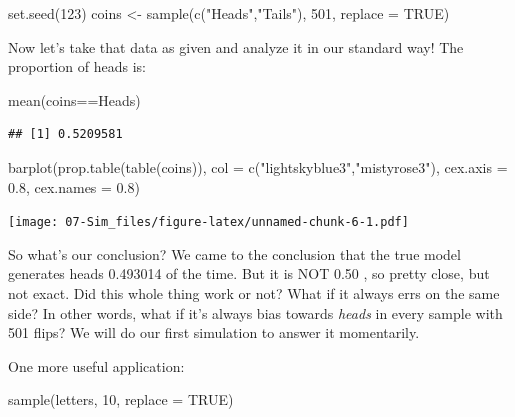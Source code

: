 \documentclass[
]{book}
\newenvironment{Shaded}{\begin{snugshade}}{\end{snugshade}}
\newcommand{\AttributeTok}[1]{\textcolor[rgb]{0.77,0.63,0.00}{#1}}
\newcommand{\ConstantTok}[1]{\textcolor[rgb]{0.00,0.00,0.00}{#1}}
\newcommand{\DecValTok}[1]{\textcolor[rgb]{0.00,0.00,0.81}{#1}}
\newcommand{\FloatTok}[1]{\textcolor[rgb]{0.00,0.00,0.81}{#1}}
\newcommand{\FunctionTok}[1]{\textcolor[rgb]{0.00,0.00,0.00}{#1}}
\newcommand{\NormalTok}[1]{#1}
\newcommand{\OtherTok}[1]{\textcolor[rgb]{0.56,0.35,0.01}{#1}}
\newcommand{\SpecialCharTok}[1]{\textcolor[rgb]{0.00,0.00,0.00}{#1}}
\newcommand{\StringTok}[1]{\textcolor[rgb]{0.31,0.60,0.02}{#1}}
\theoremstyle{definition}
\theoremstyle{definition}
\theoremstyle{definition}
\theoremstyle{definition}
\theoremstyle{remark}
\begin{document}
\begin{Shaded}
\begin{Highlighting}[]
\FunctionTok{set.seed}\NormalTok{(}\DecValTok{123}\NormalTok{)}
\NormalTok{coins }\OtherTok{\textless{}{-}} \FunctionTok{sample}\NormalTok{(}\FunctionTok{c}\NormalTok{(}\StringTok{"Heads"}\NormalTok{,}\StringTok{"Tails"}\NormalTok{), }\DecValTok{501}\NormalTok{, }\AttributeTok{replace =} \ConstantTok{TRUE}\NormalTok{)}
\end{Highlighting}
\end{Shaded}

Now let's take that data as given and analyze it in our standard way! The proportion of heads is:

\begin{Shaded}
\begin{Highlighting}[]
\FunctionTok{mean}\NormalTok{(coins}\SpecialCharTok{==}\StringTok{\textquotesingle{}Heads\textquotesingle{}}\NormalTok{)}
\end{Highlighting}
\end{Shaded}

\begin{verbatim}
## [1] 0.5209581
\end{verbatim}

\begin{Shaded}
\begin{Highlighting}[]
\FunctionTok{barplot}\NormalTok{(}\FunctionTok{prop.table}\NormalTok{(}\FunctionTok{table}\NormalTok{(coins)), }
        \AttributeTok{col =} \FunctionTok{c}\NormalTok{(}\StringTok{"lightskyblue3"}\NormalTok{,}\StringTok{"mistyrose3"}\NormalTok{),}
        \AttributeTok{cex.axis =} \FloatTok{0.8}\NormalTok{, }\AttributeTok{cex.names =} \FloatTok{0.8}\NormalTok{)}
\end{Highlighting}
\end{Shaded}

\texttt{[image: 07-Sim\_files/figure-latex/unnamed-chunk-6-1.pdf]}

So what's our conclusion? We came to the conclusion that the true model generates heads 0.493014 of the time. But it is NOT 0.50 , so pretty close, but not exact. Did this whole thing work or not? What if it always errs on the same side? In other words, what if it's always bias towards \emph{heads} in every sample with 501 flips? We will do our first simulation to answer it momentarily.

One more useful application:

\begin{Shaded}
\begin{Highlighting}[]
\FunctionTok{sample}\NormalTok{(letters, }\DecValTok{10}\NormalTok{, }\AttributeTok{replace =} \ConstantTok{TRUE}\NormalTok{)}
\end{Highlighting}
\end{Shaded}
\end{document}
